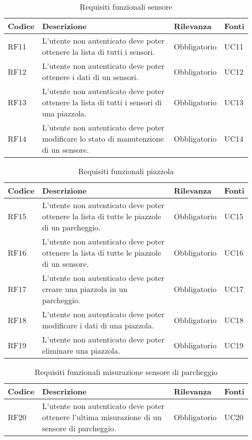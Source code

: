 \begin{table}[H]
    \begin{tabular}{|p{1cm}|p{6cm}|p{1.9cm}|p{1.8cm}|} 
    \hline
    Codice & Descrizione & Rilevanza &  Fonti \\ 
    \hline
    RF11 & L'utente non autenticato deve poter ottenere la lista di tutti i sensori. & Obbligatorio & UC11 \\ 
    \hline
    RF12 & L'utente non autenticato deve poter ottenere i dati di un sensori. & Obbligatorio & UC12 \\ 
    \hline
    RF13 & L'utente non autenticato deve poter ottenere la lista di tutti i sensori di una piazzola. & Obbligatorio & UC13 \\ 
    \hline
    RF14 & L'utente non autenticato deve poter modificare lo stato di manutenzione di un sensore. & Obbligatorio & UC14 \\ 
    \hline
    \end{tabular}
    \caption{Requisiti funzionali sensore}
\end{table}
\clearpage
\begin{table}[H]
    \begin{tabular}{|p{1cm}|p{6cm}|p{1.9cm}|p{1.8cm}|} 
    \hline
    Codice & Descrizione & Rilevanza &  Fonti \\ 
    \hline
    RF15 & L'utente non autenticato deve poter ottenere la lista di tutte le piazzole di un parcheggio. & Obbligatorio & UC15 \\ 
    \hline
    RF16 & L'utente non autenticato deve poter ottenere la lista di tutte le piazzole di un sensore. & Obbligatorio & UC16 \\ 
    \hline
    RF17 & L'utente non autenticato deve poter creare una piazzola in un parcheggio. & Obbligatorio & UC17 \\ 
    \hline
    RF18 & L'utente non autenticato deve poter modificare i dati di una piazzola. & Obbligatorio & UC18 \\
    \hline
    RF19 & L'utente non autenticato deve poter eliminare una piazzola. & Obbligatorio & UC19 \\
    \hline
    \end{tabular}
    \caption{Requisiti funzionali piazzola}
\end{table}

\begin{table}[H]
    \begin{tabular}{|p{1cm}|p{6cm}|p{1.9cm}|p{1.8cm}|} 
    \hline
    Codice & Descrizione & Rilevanza &  Fonti \\ 
    \hline
    RF20 & L'utente non autenticato deve poter ottenere l'ultima misurazione di un sensore di parcheggio. & Obbligatorio & UC20 \\ 
    \hline
    \end{tabular}
    \caption{Requisiti funzionali misurazione sensore di parcheggio}
\end{table}

